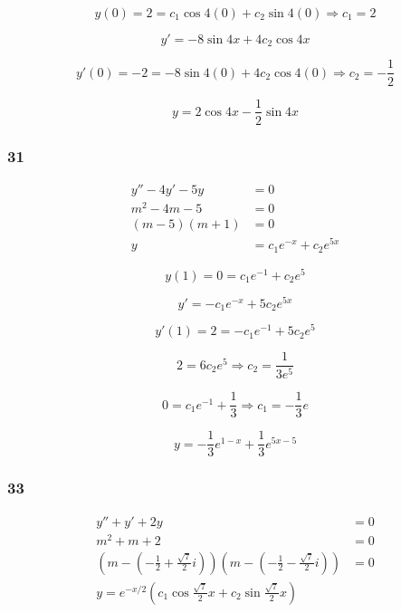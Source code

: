 \documentclass{article}
\begin{document}
\[y(0) = 2 = c_1 \cos 4 (0) + c_2 \sin 4 (0) \Rightarrow c_1 = 2\]

\[y' = -8 \sin 4x + 4 c_2 \cos 4x\]

\[y'(0) = -2 = -8 \sin 4 (0) + 4 c_2 \cos 4 (0) \Rightarrow c_2 = -\frac{1}{2}\]

\[y = 2 \cos 4x - \frac{1}{2} \sin 4x\]

\subsubsection{31}

\begin{align*}
  y'' - 4y' - 5y  & = 0                       \\
  m^2 - 4m - 5    & = 0                       \\
  (m - 5) (m + 1) & = 0                       \\
  y               & = c_1 e^{-x} + c_2 e^{5x}
\end{align*}

\[y(1) = 0 = c_1 e^{-1} + c_2 e^5\]

\[y' = -c_1 e^{-x} + 5 c_2 e^{5x}\]

\[y'(1) = 2 = -c_1 e^{-1} + 5 c_2 e^5\]

\[2 = 6 c_2 e^5 \Rightarrow c_2 = \frac{1}{3 e^5}\]

\[0 = c_1 e^{-1} + \frac{1}{3} \Rightarrow c_1 = -\frac{1}{3} e\]

\[y = -\frac{1}{3} e^{1 - x} + \frac{1}{3} e^{5x - 5}\]

\subsubsection{33}

\begin{align*}
  y'' + y' + 2y                                                                                                                               & = 0 \\
  m^2 + m + 2                                                                                                                                 & = 0 \\
  \left( m - \left( -\frac{1}{2} + \frac{\sqrt{7}}{2} i \right) \right) \left( m - \left( -\frac{1}{2} - \frac{\sqrt{7}}{2} i \right) \right) & = 0 \\
  y = e^{-x / 2} \left( c_1 \cos \frac{\sqrt{7}}{2} x + c_2 \sin \frac{\sqrt{7}}{2} x \right)
\end{align*}
\end{document}
